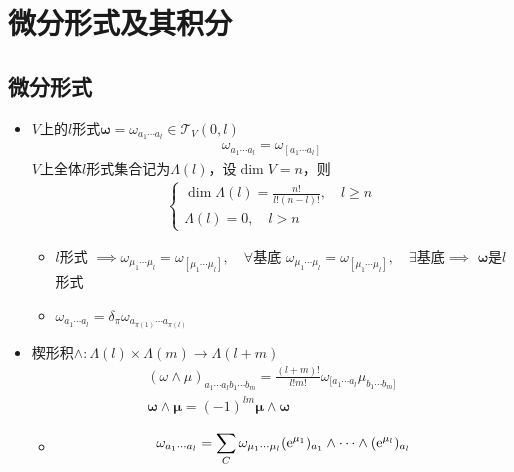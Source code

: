 \chapter{微分形式及其积分}

\section{微分形式}

\begin{itemize}
    \item $V$上的$l$形式$\bm{\omega}=\omega_{a_1 \cdots a_l} \in \mathscr{T}_V(0,l)$
    \begin{gather*}
        \omega_{a_1 \cdots a_l}=\omega_{[a_1 \cdots a_l]}
    \end{gather*}
    $V$上全体$l$形式集合记为$\Lambda(l)$，设$\dim V=n$，则
    \begin{gather*}
        \begin{cases}
            \dim \Lambda(l)=\frac{n!}{l!(n-l)!},\quad l\geq n
            \\
            \Lambda(l)={0},\quad l > n
        \end{cases}
    \end{gather*}
    \begin{itemize}
        \item $l$形式 $\implies \omega_{\mu_1 \cdots \mu_l}=\omega_{[\mu_1 \cdots \mu_l]},\quad \forall \text{基底}$
        $\omega_{\mu_1 \cdots \mu_l}=\omega_{[\mu_1 \cdots \mu_l]},\quad \exists\text{基底} \implies$ $\bm{\omega}$是$l$形式
        \item $\omega_{a_1 \cdots a_l}=\delta_{\pi} \omega_{a_{\pi(1)} \cdots a_{\pi(l)}}$
    \end{itemize}
    \item 楔形积$\wedge:\Lambda(l) \times \Lambda(m) \to \Lambda(l+m)$
    \begin{gather*}
        (\omega \wedge \mu)_{a_1 \cdots a_l b_1 \cdots b_m}=\frac{(l+m)!}{l!m!} \omega_{[a_1 \cdots a_l} \mu_{b_1 \cdots b_m]}
        \\
        \bm{\omega} \wedge \bm{\mu}=(-1)^{lm} \bm{\mu} \wedge \bm{\omega}
    \end{gather*}
    \begin{itemize}
        \item \begin{align*}
            \omega_{a_1 \cdots a_l}&=\displaystyle \sum_{C} \omega_{\mu_1 \cdots \mu_l}  (\e^{\mu_1})_{a_1} \wedge \cdots \wedge (\e^{\mu_l})_{a_l}
            \\

\end{align*}
\end{itemize}
\end{itemize}
